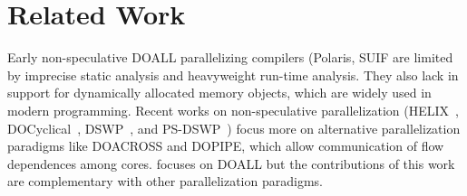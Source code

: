 \section{Related Work}






Early non-speculative DOALL parallelizing compilers
(Polaris\cite{blume:94:polaris},
SUIF\cite{amarasinghe:93:pldi,suif:94:stanford} are limited by imprecise
static analysis and heavyweight run-time analysis. They also lack in
support for dynamically allocated memory objects, which are widely used in
modern programming. Recent works on non-speculative parallelization
(HELIX~\cite{simone:12:cgo}, DOCyclical~\cite{yu2016cyclical},
DSWP~\cite{ottoni:05:micro}, and PS-DSWP~\cite{raman:08a:cgo}) focus more
on alternative parallelization paradigms like DOACROSS and DOPIPE, which
allow communication of flow dependences among cores. \name focuses on DOALL
but the contributions of this work are complementary with other
parallelization paradigms.

